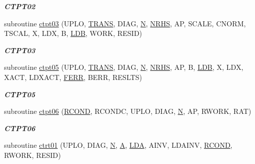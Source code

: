 \begin{DoxyCompactItemize}
\begin{DoxyCompactList}\small\item\em {\bfseries C\+T\+P\+T02} \end{DoxyCompactList}\item 
subroutine \hyperlink{group__complex__lin_gafa4a5c4022216550a39c345966fa056e}{ctpt03} (U\+P\+L\+O, \hyperlink{superlu__enum__consts_8h_a0c4e17b2d5cea33f9991ccc6a6678d62a1f61e3015bfe0f0c2c3fda4c5a0cdf58}{T\+R\+A\+N\+S}, D\+I\+A\+G, \hyperlink{polmisc_8c_a0240ac851181b84ac374872dc5434ee4}{N}, \hyperlink{example__user_8c_aa0138da002ce2a90360df2f521eb3198}{N\+R\+H\+S}, A\+P, S\+C\+A\+L\+E, C\+N\+O\+R\+M, T\+S\+C\+A\+L, X, L\+D\+X, B, \hyperlink{example__user_8c_a50e90a7104df172b5a89a06c47fcca04}{L\+D\+B}, W\+O\+R\+K, R\+E\+S\+I\+D)
\begin{DoxyCompactList}\small\item\em {\bfseries C\+T\+P\+T03} \end{DoxyCompactList}\item 
subroutine \hyperlink{group__complex__lin_gaf3ca0f260664c6296c9d948f203d28a3}{ctpt05} (U\+P\+L\+O, \hyperlink{superlu__enum__consts_8h_a0c4e17b2d5cea33f9991ccc6a6678d62a1f61e3015bfe0f0c2c3fda4c5a0cdf58}{T\+R\+A\+N\+S}, D\+I\+A\+G, \hyperlink{polmisc_8c_a0240ac851181b84ac374872dc5434ee4}{N}, \hyperlink{example__user_8c_aa0138da002ce2a90360df2f521eb3198}{N\+R\+H\+S}, A\+P, B, \hyperlink{example__user_8c_a50e90a7104df172b5a89a06c47fcca04}{L\+D\+B}, X, L\+D\+X, X\+A\+C\+T, L\+D\+X\+A\+C\+T, \hyperlink{superlu__enum__consts_8h_af00a42ecad444bbda75cde1b64bd7e72a78fd14d7abebae04095cfbe02928f153}{F\+E\+R\+R}, B\+E\+R\+R, R\+E\+S\+L\+T\+S)
\begin{DoxyCompactList}\small\item\em {\bfseries C\+T\+P\+T05} \end{DoxyCompactList}\item 
subroutine \hyperlink{group__complex__lin_ga6096fde995751b11c512561ecffccdb6}{ctpt06} (\hyperlink{superlu__enum__consts_8h_af00a42ecad444bbda75cde1b64bd7e72a9b5c151728d8512307565994c89919d5}{R\+C\+O\+N\+D}, R\+C\+O\+N\+D\+C, U\+P\+L\+O, D\+I\+A\+G, \hyperlink{polmisc_8c_a0240ac851181b84ac374872dc5434ee4}{N}, A\+P, R\+W\+O\+R\+K, R\+A\+T)
\begin{DoxyCompactList}\small\item\em {\bfseries C\+T\+P\+T06} \end{DoxyCompactList}\item 
subroutine \hyperlink{group__complex__lin_ga9575a6c04571e394dd000d386dda6bfa}{ctrt01} (U\+P\+L\+O, D\+I\+A\+G, \hyperlink{polmisc_8c_a0240ac851181b84ac374872dc5434ee4}{N}, \hyperlink{classA}{A}, \hyperlink{example__user_8c_ae946da542ce0db94dced19b2ecefd1aa}{L\+D\+A}, A\+I\+N\+V, L\+D\+A\+I\+N\+V, \hyperlink{superlu__enum__consts_8h_af00a42ecad444bbda75cde1b64bd7e72a9b5c151728d8512307565994c89919d5}{R\+C\+O\+N\+D}, R\+W\+O\+R\+K, R\+E\+S\+I\+D)

\end{DoxyCompactItemize}
